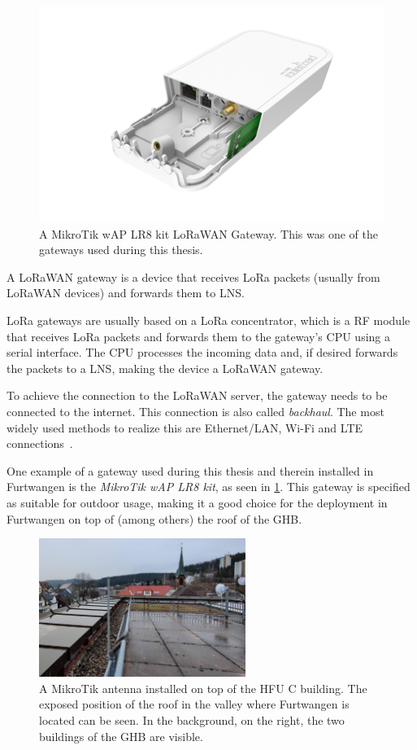 \begin{figure}[htbp]
    \centering
    \includegraphics[width=.6\textwidth]{pictures/hardware/gateways/mikrotik-lr8-kit.png}
    \caption{
        A MikroTik wAP LR8 kit \ac{LoRaWAN} Gateway.
        This was one of the gateways used during this thesis.~\protect\cite{the_things_industries_bv_lorawan_nodate}
    }\label{pic:mikrotik-lr8-kit-gateway}
\end{figure}

A \ac{LoRaWAN} gateway is a device that receives \ac{LoRa} packets (usually from \ac{LoRaWAN} devices) and forwards them to \ac{LNS}.

\ac{LoRa} gateways are usually based on a \ac{LoRa} concentrator, which is a \ac{RF} module that receives \ac{LoRa} packets and forwards them to the gateway's \ac{CPU} using a serial interface.
The \ac{CPU} processes the incoming data and, if desired forwards the packets to a \ac{LNS}, making the device a \ac{LoRaWAN} gateway.

To achieve the connection to the \ac{LoRaWAN} server, the gateway needs to be connected to the internet.
This connection is also called \emph{backhaul}.
The most widely used methods to realize this are Ethernet/\ac{LAN}, Wi-Fi and \ac{LTE} connections~\cite{the_things_industries_bv_lorawan_nodate}.

One example of a gateway used during this thesis and therein installed in Furtwangen is the \emph{MikroTik wAP LR8 kit}, as seen in \cref{pic:mikrotik-lr8-kit-gateway}.
This gateway is specified as suitable for outdoor usage, making it a good choice for the deployment in Furtwangen on top of (among others) the roof of the \acf{GHB}.

\begin{figure}[htbp]
    \centering
    \includegraphics[width=0.6\textwidth]{pictures/hardware/gateway-deployment/mikrotik-antenna-c-building.jpg}
    \caption{
        A MikroTik antenna installed on top of the \ac{HFU} C building.
        The exposed position of the roof in the valley where Furtwangen is located can be seen.
        In the background, on the right, the two buildings of the \acf{GHB} are visible.
    }\label{pic:mikrotik-antenna-c-building}
\end{figure}

